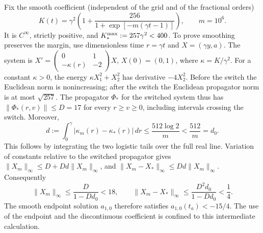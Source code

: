 \documentclass[11pt,a4paper]{amsart}
\theoremstyle{remark}
\theoremstyle{plain}
\theoremstyle{remark}
\numberwithin{equation}{section}
\begin{document}
Fix the smooth coefficient (independent of the grid and of the fractional orders)
\begin{equation}\label{eq:st05-K}
 K(t)=\gamma^2\left(1+\frac{256}{1+\exp[-m(\gamma t-1)]}\right),\qquad m=10^6.
\end{equation}
It is $C^\infty$, strictly positive, and $K_*^{\rm max}:=257\gamma^2<400$. To prove smoothing preserves the margin, use dimensionless time $r=\gamma t$ and $X=(\gamma y,a)$. The system is $X'=\left(\begin{smallmatrix}0&1\\-\kappa(r)&-2\end{smallmatrix}\right)X$, $X(0)=(0,1)$, where $\kappa=K/\gamma^2$. For a constant $\kappa>0$, the energy $\kappa X_1^2+X_2^2$ has derivative $-4X_2^2$. Before the switch the Euclidean norm is nonincreasing; after the switch the Euclidean propagator norm is at most $\sqrt{257}$. The propagator $\Phi_*$ for the switched system thus has $\|\Phi_*(r,v)\|\le D=17$ for every $r\ge v\ge0$, including intervals crossing the switch. Moreover,
\[
 d:=\int_0^\gamma|\kappa_m(r)-\kappa_*(r)|\,dr
 \le\frac{512\log 2}{m}<\frac{512}{m}=d_0.
\]
This follows by integrating the two logistic tails over the full real line. Variation of constants relative to the switched propagator gives $\|X_m\|_\infty\le D+Dd\|X_m\|_\infty$, and $\|X_m-X_*\|_\infty\le Dd\|X_m\|_\infty$. Consequently
\begin{equation}\label{eq:st05-smoothing}
 \|X_m\|_\infty\le\frac{D}{1-Dd_0}<18,\qquad
 \|X_m-X_*\|_\infty\le\frac{D^2d_0}{1-Dd_0}<\frac14.
\end{equation}
The smooth endpoint solution $a_{1,0}$ therefore satisfies $a_{1,0}(t_a)<-15/4$. The use of the endpoint and the discontinuous coefficient is confined to this intermediate calculation.
\end{document}
